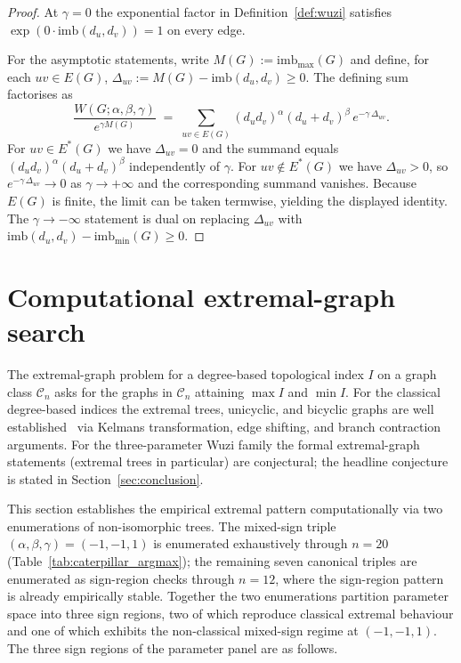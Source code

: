 \documentclass[a5paper, 10pt]{article}
\theoremstyle{plain}
\theoremstyle{remark}
\theoremstyle{definition}
\newcommand{\Wuzi}{W(G;\alpha,\beta,\gamma)}
\begin{document}
\begin{proof}
At $\gamma = 0$ the exponential factor in
Definition~\ref{def:wuzi} satisfies
$\exp(0 \cdot \mathrm{imb}(d_u, d_v)) = 1$ on every edge.

For the asymptotic statements, write
$M(G) := \mathrm{imb}_{\max}(G)$ and define, for each
$uv \in E(G)$,
$\Delta_{uv} := M(G) - \mathrm{imb}(d_u, d_v) \ge 0$. The defining
sum factorises as
\[
\frac{\Wuzi}{e^{\gamma M(G)}}
\;=\;\sum_{uv \in E(G)}
(d_u d_v)^{\alpha}(d_u + d_v)^{\beta}\,
e^{-\gamma\, \Delta_{uv}}.
\]
For $uv \in E^{*}(G)$ we have $\Delta_{uv} = 0$ and the summand
equals $(d_u d_v)^{\alpha}(d_u + d_v)^{\beta}$ independently of
$\gamma$. For $uv \notin E^{*}(G)$ we have $\Delta_{uv} > 0$, so
$e^{-\gamma\, \Delta_{uv}} \to 0$ as $\gamma \to +\infty$ and the
corresponding summand vanishes. Because $E(G)$ is finite, the
limit can be taken termwise, yielding the displayed identity. The
$\gamma \to -\infty$ statement is dual on replacing
$\Delta_{uv}$ with
$\mathrm{imb}(d_u, d_v) - \mathrm{imb}_{\min}(G) \ge 0$.
\end{proof}

\section{Computational extremal-graph search}\label{sec:extremal}

The extremal-graph problem for a degree-based topological index
$I$ on a graph class $\mathcal{C}_n$ asks for the graphs in
$\mathcal{C}_n$ attaining $\max I$ and $\min I$. For the
classical degree-based indices the extremal trees, unicyclic, and
bicyclic graphs are well
established~\cite{Randic1975, GutmanFurtula2008Randic} via
Kelmans transformation, edge shifting, and branch contraction
arguments. For the three-parameter Wuzi family the formal
extremal-graph statements (extremal trees in particular) are
conjectural; the headline conjecture is stated in
Section~\ref{sec:conclusion}.

This section establishes the empirical extremal pattern
computationally via two enumerations of non-isomorphic trees. The
mixed-sign triple $(\alpha, \beta, \gamma) = (-1, -1, 1)$ is
enumerated exhaustively through $n = 20$
(Table~\ref{tab:caterpillar_argmax}); the remaining seven
canonical triples are enumerated as sign-region checks through
$n = 12$, where the sign-region pattern is already empirically
stable. Together the two enumerations partition parameter space
into three sign regions, two of which reproduce classical
extremal behaviour and one of which exhibits the non-classical
mixed-sign regime at $(-1, -1, 1)$. The three sign regions of the parameter panel are as
follows.
\end{document}
